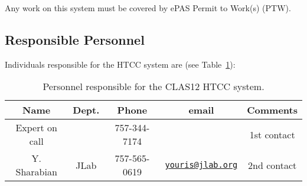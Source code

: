 Any work on this system must be covered by ePAS Permit to Work(s) (PTW).

\subsection{Responsible Personnel}

Individuals responsible for the HTCC system are (see Table~\ref{tb:htcc}):

\begin{table}[!htb]
\centering
\begin{tabular}{|c|c|c|c|c|} \hline
Name          & Dept.& Phone        & email &Comments \\ \hline
Expert on call&      & 757-344-7174 &       & 1st contact \\ \hline
Y. Sharabian  & JLab & 757-565-0619 &\href{mailto:youris@jlab.org}{\nolinkurl{youris@jlab.org}}&2nd contact \\ \hline
\end{tabular}
\caption{Personnel responsible for the CLAS12 HTCC system.} 
\label{tb:htcc}
\end{table}

